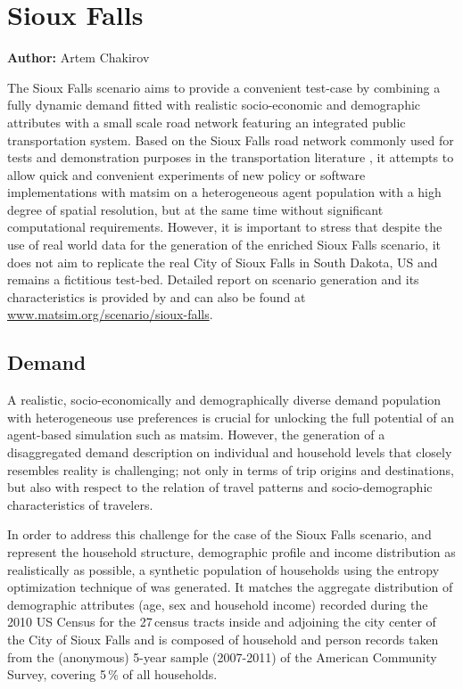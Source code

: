\section{Sioux Falls}
\label{ch:scenarios:siouxfalls}
\hfill \textbf{Author:} Artem Chakirov

The Sioux Falls scenario aims to provide a convenient test-case by combining a fully dynamic demand fitted with realistic socio-economic and demographic attributes with a small scale road network featuring an integrated public transportation system. Based on the Sioux Falls road network commonly used for tests and demonstration purposes in the transportation literature \citep[][]{BarGera_TNTP_Webpage_2013}, it attempts to allow quick and convenient experiments of new policy or software implementations with \gls{matsim} on a heterogeneous agent population with a high degree of spatial resolution, but at the same time without significant computational requirements. However, it is important to stress that despite the use of real world data for the generation of the enriched Sioux Falls scenario, it does not aim to replicate the real City of Sioux Falls in South Dakota, US and remains a fictitious test-bed. Detailed report on scenario generation and its characteristics is provided by \citet[][]{ChakirovFourie_TechRep_FCL_2014} and can also be found at \url{www.matsim.org/scenario/sioux-falls}. 

\subsection{Demand}
A realistic, socio-economically and demographically diverse demand population with  heterogeneous use preferences is crucial for unlocking the full potential of an agent-based simulation such as \gls{matsim}. However, the generation of a disaggregated demand description on individual and household levels that closely resembles reality is challenging; not only in terms of trip origins and destinations, but also with respect to the relation of travel patterns and socio-demographic characteristics of travelers.

In order to address this challenge for the case of the Sioux Falls scenario, and represent the household structure, demographic profile and income distribution as realistically as possible, a synthetic population of households using the entropy optimization technique of \citet[][]{BarGeraEtAl_TRB_2009} was generated. It matches the aggregate distribution of demographic attributes (age, sex and household income) recorded during the 2010 US Census for the 27\,census tracts inside and adjoining the city center of the City of Sioux Falls and is composed of household and person records taken from the (anonymous) 5-year sample (2007-2011) of the American Community Survey, covering 5\,\% of all households.

